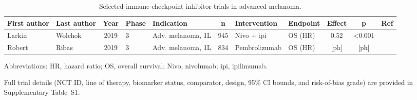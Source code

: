 %
%
%

\begin{table}[htbp]
  \centering
  \small
  \begin{threeparttable}
    \caption{Selected immune-checkpoint inhibitor trials in advanced melanoma.}
    \label{tab:ici-trials}
    \begin{tabular}{@{}llcllS[table-format=4.0]llS[table-format=1.2]S[table-format=<1.3]l@{}}
      \toprule
      First author & Last author & Year & Phase & Indication & {n} & Intervention & Endpoint & {Effect} & {p} & Ref \\
      \midrule
      Larkin & Wolchok & 2019 & 3 & Adv. melanoma, 1L & 945 & Nivo + ipi    & OS (HR) & 0.52  & <0.001 & \cite{larkin2019} \\
      Robert & Ribas   & 2019 & 3 & Adv. melanoma, 1L & 834 & Pembrolizumab & OS (HR) & {[ph]} & {[ph]} & \cite{robert2019} \\
      \bottomrule
    \end{tabular}
    \begin{tablenotes}[flushleft]
      \footnotesize
      \item Abbreviations: HR, hazard ratio; OS, overall survival;
            Nivo, nivolumab; ipi, ipilimumab.
      \item Full trial details (NCT ID, line of therapy, biomarker status,
            comparator, design, 95\% CI bounds, and risk-of-bias grade) are
            provided in Supplementary Table~S1.
    \end{tablenotes}
  \end{threeparttable}
\end{table}


